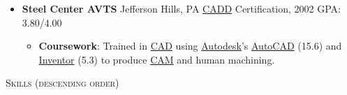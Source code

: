 \documentclass{article}
\newcommand{\lineunder}{\vspace*{-8pt} \\ \hspace*{-18pt} \hrulefill \\}
\newcommand{\header}[1]{{\hspace*{-15pt}\vspace*{6pt} \textsc{#1}} \vspace*{-6pt} \lineunder}
\newenvironment{achievements}{\begin{list}{$\bullet$}{\topsep 0pt \itemsep -2pt}}{\vspace*{4pt}\end{list}}
\begin{document}
\begin{itemize}[leftmargin=*]
  \item \textbf{Steel Center AVTS} Jefferson Hills, PA \href{http://en.wikipedia.org/wiki/Computer-aided_design}{CADD} Certification, 2002 GPA: 3.80/4.00
  \begin{itemize}
    \item \textbf{Coursework}: Trained in \href{http://en.wikipedia.org/wiki/Computer-aided_design}{CAD} using \href{http://www.autodesk.com/}{Autodesk}'s \href{http://www.autodesk.com/  products/autocad/overview}{AutoCAD} (15.6) and \href{http://www.autodesk.com/products/autodesk-inventor-family/overview}{Inventor} (5.3) to produce \href{http://en.wikipedia.org/wiki/Computer-aided_manufacturing}{CAM} and human machining.  
  \end{itemize}

\end{itemize}

\header{Skills (descending order)}

\end{document}

